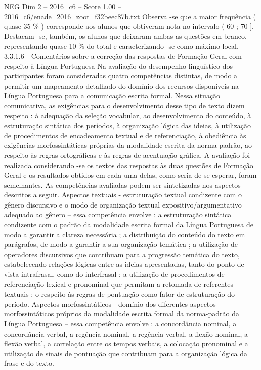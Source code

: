 \begin{textsample}{NEG Dim 2 – 2016\_c6 – Score 1.00 – 2016\_c6/enade\_2016\_zoot\_f32beec87b.txt}
Observa -se que a maior frequência ( quase 35 \% ) corresponde aos alunos que obtiveram nota no intervalo ( 60 ; 70 ].
Destacam -se, também, os alunos que deixaram ambas as questões em branco, representando quase 10 \% do total e caracterizando -se como máximo local. 3.3.1.6 - Comentários sobre a correção das respostas de Formação Geral com respeito à Língua Portuguesa Na avaliação do desempenho linguístico dos participantes foram consideradas quatro competências distintas, de modo a permitir um mapeamento detalhado do domínio dos recursos disponíveis na Língua Portuguesa para a comunicação escrita formal.
Nessa situação comunicativa, as exigências para o desenvolvimento desse tipo de texto dizem respeito : à adequação da seleção vocabular, ao desenvolvimento do conteúdo, à estruturação sintática dos períodos, à organização lógica das ideias, à utilização de procedimentos de encadeamento textual e de referenciação, à obediência às exigências morfossintáticas próprias da modalidade escrita da norma-padrão, ao respeito às regras ortográficas e às regras de acentuação gráfica.
A avaliação foi realizada considerando -se os textos das respostas às duas questões de Formação Geral e os resultados obtidos em cada uma delas, como seria de se esperar, foram semelhantes.
As competências avaliadas podem ser sintetizadas nos aspectos descritos a seguir.
Aspectos textuais - estruturação textual condizente com o gênero discursivo e o modo de organização textual expositivo/argumentativo adequado ao gênero – essa competência envolve : a estruturação sintática condizente com o padrão da modalidade escrita formal da Língua Portuguesa de modo a garantir a clareza necessária ; a distribuição do conteúdo do texto em parágrafos, de modo a garantir a sua organização temática ; a utilização de operadores discursivos que contribuam para a progressão temática do texto, estabelecendo relações lógicas entre as ideias apresentadas, tanto do ponto de vista intrafrasal, como do interfrasal ; a utilização de procedimentos de referenciação lexical e pronominal que permitam a retomada de referentes textuais ; o respeito às regras de pontuação como fator de estruturação do período.
Aspectos morfossintáticos - domínio dos diferentes aspectos morfossintáticos próprios da modalidade escrita formal da norma-padrão da Língua Portuguesa – essa competência envolve : a concordância nominal, a concordância verbal, a regência nominal, a regência verbal, a flexão nominal, a flexão verbal, a correlação entre os tempos verbais, a colocação pronominal e a utilização de sinais de pontuação que contribuam para a organização lógica da frase e do texto.

\end{textsample}
